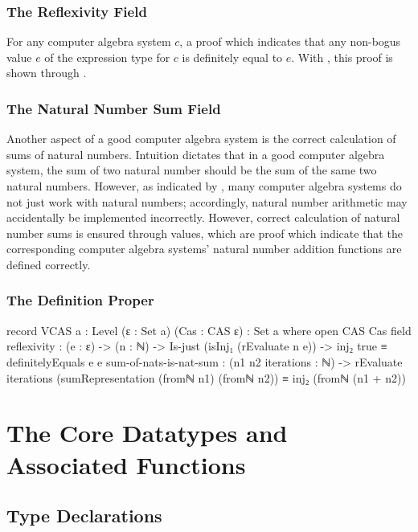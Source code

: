 \documentclass{report}
\begin{document}
\subsection{The Reflexivity Field}
For any  computer algebra system \(c\), a proof which indicates that any non-bogus value \(e\) of the expression type for \(c\) is definitely equal to \(e\).  With , this proof is shown through .

\subsection{The Natural Number Sum Field}
Another aspect of a good computer algebra system is the correct calculation of sums of natural numbers.  Intuition dictates that in a good computer algebra system, the sum of two natural number should be the sum of the same two natural numbers.  However, as indicated by , many computer algebra systems do not just work with natural numbers; accordingly, natural number arithmetic may accidentally be implemented incorrectly.  However, correct calculation of natural number sums is ensured through  values, which are proof which indicate that the corresponding computer algebra systems' natural number addition functions are defined correctly.

\subsection{The Definition Proper}

\begin{code}
record VCAS {a : Level} (ε : Set a) (Cas : CAS ε) : Set a where
  open CAS Cas
  field
    reflexivity : (e : ε) ->
                  (n : ℕ) ->
                  Is-just (isInj₁ (rEvaluate n e)) ->
                  inj₂ true ≡ definitelyEquals e e
    sum-of-nats-is-nat-sum :
      (n1 n2 iterations : ℕ) ->
      rEvaluate iterations (sumRepresentation (fromℕ n1) (fromℕ n2)) ≡
        inj₂ (fromℕ (n1 + n2))
\end{code}

\chapter{The Core Datatypes and Associated Functions}

\section{Type Declarations}
\end{document}
